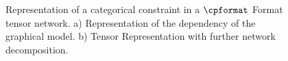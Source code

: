 
\begin{figure}[t]
    \begin{center}
        
    \end{center}
    \caption{Representation of a categorical constraint in a $\cpformat$ Format tensor network.
    a) Representation of the dependency of the graphical model.
    b) Tensor Representation with further network decomposition.
    }
    \label{fig:categoricalDecomposition}
\end{figure}








